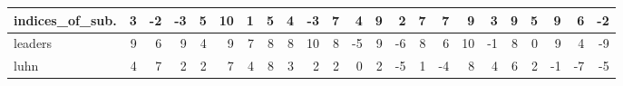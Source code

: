 \begin{table}[!h]
{\begin{tabular}{|p{2.9cm}|rr|rr|rr|rr|rr|r||rr|rr|rr|rr|rr|r|}
			indices\_of\_sub.      & \cellcolor[HTML]{D3E5CB}3            & {\cellcolor[HTML]{FAE4E3}-2}           & \cellcolor[HTML]{F7D7D5}-3           & {\cellcolor[HTML]{B5D4A7}5}            & \cellcolor[HTML]{6AA84F}10           & {\cellcolor[HTML]{F1F7EE}1}            & \cellcolor[HTML]{B5D4A7}5            & {\cellcolor[HTML]{C4DDB9}4}            & \cellcolor[HTML]{F7D7D5}-3           & {\cellcolor[HTML]{97C384}7}            & \cellcolor[HTML]{B4CFFB}4             & \cellcolor[HTML]{79B161}9            & {\cellcolor[HTML]{E2EEDC}2}            & \cellcolor[HTML]{97C384}7            & {\cellcolor[HTML]{97C384}7}            & \cellcolor[HTML]{79B161}9            & {\cellcolor[HTML]{D3E5CB}3}            & \cellcolor[HTML]{79B161}9            & {\cellcolor[HTML]{B5D4A7}5}            & \cellcolor[HTML]{79B161}9            & {\cellcolor[HTML]{A6CB96}6}            & \cellcolor[HTML]{B49161}-2            \\ \hline
			leaders                & \cellcolor[HTML]{79B161}9            & {\cellcolor[HTML]{A6CB96}6}            & \cellcolor[HTML]{79B161}9            & {\cellcolor[HTML]{C4DDB9}4}            & \cellcolor[HTML]{79B161}9            & {\cellcolor[HTML]{97C384}7}            & \cellcolor[HTML]{88BA73}8            & {\cellcolor[HTML]{88BA73}8}            & \cellcolor[HTML]{6AA84F}10           & {\cellcolor[HTML]{88BA73}8}            & \cellcolor[HTML]{FFCC7F}-5            & \cellcolor[HTML]{79B161}9            & {\cellcolor[HTML]{F0B0AB}-6}           & \cellcolor[HTML]{88BA73}8            & {\cellcolor[HTML]{A6CB96}6}            & \cellcolor[HTML]{6AA84F}10           & {\cellcolor[HTML]{FCF1F1}-1}           & \cellcolor[HTML]{88BA73}8            & {\cellcolor[HTML]{FFFFFF}0}            & \cellcolor[HTML]{79B161}9            & {\cellcolor[HTML]{C4DDB9}4}            & \cellcolor[HTML]{F6980C}-9            \\ \hline
			luhn                   & \cellcolor[HTML]{C4DDB9}4            & {\cellcolor[HTML]{97C384}7}            & \cellcolor[HTML]{E2EEDC}2            & {\cellcolor[HTML]{E2EEDC}2}            & \cellcolor[HTML]{97C384}7            & {\cellcolor[HTML]{C4DDB9}4}            & \cellcolor[HTML]{88BA73}8            & {\cellcolor[HTML]{D3E5CB}3}            & \cellcolor[HTML]{E2EEDC}2            & {\cellcolor[HTML]{E2EEDC}2}            & \cellcolor[HTML]{FFFFFF}0             & \cellcolor[HTML]{E2EEDC}2            & {\cellcolor[HTML]{F2BDB9}-5}           & \cellcolor[HTML]{F1F7EE}1            & {\cellcolor[HTML]{F5CAC7}-4}           & \cellcolor[HTML]{88BA73}8            & {\cellcolor[HTML]{C4DDB9}4}            & \cellcolor[HTML]{A6CB96}6            & {\cellcolor[HTML]{E2EEDC}2}            & \cellcolor[HTML]{FCF1F1}-1           & {\cellcolor[HTML]{EDA39D}-7}           & \cellcolor[HTML]{D0943D}-5            \\ \hline

\end{tabular}}
\end{table}
